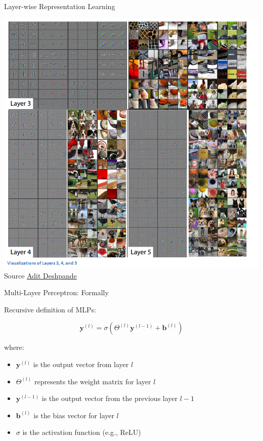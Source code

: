 \documentclass[aspectratio=169]{../latex_main/tntbeamer}  %
\begin{document}
        \begin{frame}{Layer-wise Representation Learning}

            \centering
            \includegraphics[width=0.42\linewidth]{figure/deconvnet2.png}\\
            Source \href{https://adeshpande3.github.io/The-9-Deep-Learning-Papers-You-Need-To-Know-About.html}{Adit Deshpande}
            
        \end{frame}

 	\begin{frame}{Multi-Layer Perceptron: Formally}

        Recursive definition of MLPs:

            \[
            \textbf{y}^{(l)} = \sigma({\Theta}^{(l)} \textbf{y}^{(l-1)} + \textbf{b}^{(l)})
            \]
            
            where:
            \begin{itemize}
                \item \( \textbf{y}^{(l)} \) is the output vector from layer \( l \)
                \item \( {\Theta}^{(l)} \) represents the weight matrix for layer \( l \)
                \item \( \textbf{y}^{(l-1)} \) is the output vector from the previous layer \( l-1 \)
                \item \( \textbf{b}^{(l)} \) is the bias vector for layer \( l \)
                \item \( \sigma \) is the activation function (e.g., ReLU)
            \end{itemize}
	\end{frame}
\end{document}
